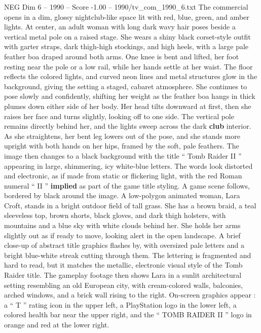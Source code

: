 \begin{textsample}{NEG Dim 6 – 1990 – Score -1.00 – 1990/tv\_com\_1990\_6.txt}  \label{ex:f6_neg_026}
The commercial opens in a dim, glossy nightclub-like space lit with red, blue, green, and amber lights.
At center, an adult woman with long dark wavy hair poses beside a vertical metal pole on a raised stage.
She wears a shiny black corset-style outfit with garter straps, dark thigh-high stockings, and high heels, with a large pale feather boa draped around both arms.
One knee is bent and lifted, her foot resting near the pole or a low rail, while her hands settle at her waist.
The floor reflects the colored lights, and curved neon lines and metal structures glow in the background, giving the setting a staged, cabaret atmosphere.
She continues to pose slowly and confidently, shifting her weight as the feather boa hangs in thick plumes down either side of her body.
Her head tilts downward at first, then she raises her face and turns slightly, looking off to one side.
The vertical pole remains directly behind her, and the lights sweep across the dark \textbf{club} interior.
As she straightens, her bent leg lowers out of the pose, and she stands more upright with both hands on her hips, framed by the soft, pale feathers.
The image then changes to a black background with the title “ Tomb Raider II ” appearing in large, shimmering, icy white-blue letters.
The words look distorted and electronic, as if made from static or flickering light, with the red Roman numeral “ II ” \textbf{implied} as part of the game title styling.
A game scene follows, bordered by black around the image.
A low-polygon animated woman, Lara Croft, stands in a bright outdoor field of tall grass.
She has a brown braid, a teal sleeveless top, brown shorts, black gloves, and dark thigh holsters, with mountains and a blue sky with white clouds behind her.
She holds her arms slightly out as if ready to move, looking alert in the open landscape.
A brief close-up of abstract title graphics flashes by, with oversized pale letters and a bright blue-white streak cutting through them.
The lettering is fragmented and hard to read, but it matches the metallic, electronic visual style of the Tomb Raider title.
The gameplay footage then shows Lara in a sunlit architectural setting resembling an old European city, with cream-colored walls, balconies, arched windows, and a brick wall rising to the right.
On-screen graphics appear : a “ T ” rating icon in the upper left, a PlayStation logo in the lower left, a colored health bar near the upper right, and the “ TOMB RAIDER II ” logo in orange and red at the lower right.

\end{textsample}
